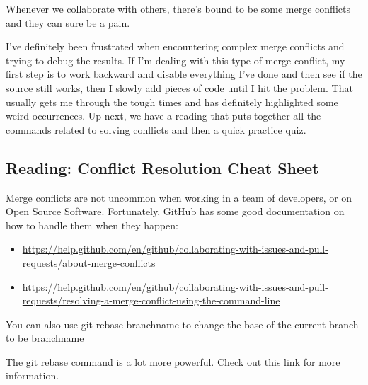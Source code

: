 Whenever we collaborate with others, there's bound to be some merge conflicts and they can sure be a pain.

I've definitely been frustrated when encountering complex merge conflicts and trying to debug the results. If I'm dealing with this type of merge conflict, my first step is to work backward and disable everything I've done and then see if the source still works, then I slowly add pieces of code until I hit the problem. That usually gets me through the tough times and has definitely highlighted some weird occurrences. Up next, we have a reading that puts together all the commands related to solving conflicts and then a quick practice quiz.

\subsection{Reading: Conflict Resolution Cheat Sheet} \label{W303f}

Merge conflicts are not uncommon when working in a team of developers, or on Open Source Software. Fortunately, GitHub has some good documentation on how to handle them when they happen:

\begin{itemize}
	\item \url{https://help.github.com/en/github/collaborating-with-issues-and-pull-requests/about-merge-conflicts}
	\item \url{https://help.github.com/en/github/collaborating-with-issues-and-pull-requests/resolving-a-merge-conflict-using-the-command-line}
\end{itemize}

You can also use git rebase branchname to change the base of the current branch to be branchname

The git rebase command is a lot more powerful.  Check out this link for more information.

